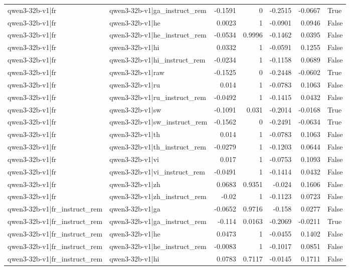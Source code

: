 \begin{table}
\begin{tabular}{l l r r r r l}
qwen3-32b-v1|fr & qwen3-32b-v1|ga_instruct_rem & -0.1591 & 0 & -0.2515 & -0.0667 & True \\
qwen3-32b-v1|fr & qwen3-32b-v1|he & 0.0023 & 1 & -0.0901 & 0.0946 & False \\
qwen3-32b-v1|fr & qwen3-32b-v1|he_instruct_rem & -0.0534 & 0.9996 & -0.1462 & 0.0395 & False \\
qwen3-32b-v1|fr & qwen3-32b-v1|hi & 0.0332 & 1 & -0.0591 & 0.1255 & False \\
qwen3-32b-v1|fr & qwen3-32b-v1|hi_instruct_rem & -0.0234 & 1 & -0.1158 & 0.0689 & False \\
qwen3-32b-v1|fr & qwen3-32b-v1|raw & -0.1525 & 0 & -0.2448 & -0.0602 & True \\
qwen3-32b-v1|fr & qwen3-32b-v1|ru & 0.014 & 1 & -0.0783 & 0.1063 & False \\
qwen3-32b-v1|fr & qwen3-32b-v1|ru_instruct_rem & -0.0492 & 1 & -0.1415 & 0.0432 & False \\
qwen3-32b-v1|fr & qwen3-32b-v1|sw & -0.1091 & 0.031 & -0.2014 & -0.0168 & True \\
qwen3-32b-v1|fr & qwen3-32b-v1|sw_instruct_rem & -0.1562 & 0 & -0.2491 & -0.0634 & True \\
qwen3-32b-v1|fr & qwen3-32b-v1|th & 0.014 & 1 & -0.0783 & 0.1063 & False \\
qwen3-32b-v1|fr & qwen3-32b-v1|th_instruct_rem & -0.0279 & 1 & -0.1203 & 0.0644 & False \\
qwen3-32b-v1|fr & qwen3-32b-v1|vi & 0.017 & 1 & -0.0753 & 0.1093 & False \\
qwen3-32b-v1|fr & qwen3-32b-v1|vi_instruct_rem & -0.0491 & 1 & -0.1414 & 0.0432 & False \\
qwen3-32b-v1|fr & qwen3-32b-v1|zh & 0.0683 & 0.9351 & -0.024 & 0.1606 & False \\
qwen3-32b-v1|fr & qwen3-32b-v1|zh_instruct_rem & -0.02 & 1 & -0.1123 & 0.0723 & False \\
qwen3-32b-v1|fr_instruct_rem & qwen3-32b-v1|ga & -0.0652 & 0.9716 & -0.158 & 0.0277 & False \\
qwen3-32b-v1|fr_instruct_rem & qwen3-32b-v1|ga_instruct_rem & -0.114 & 0.0163 & -0.2069 & -0.0211 & True \\
qwen3-32b-v1|fr_instruct_rem & qwen3-32b-v1|he & 0.0473 & 1 & -0.0455 & 0.1402 & False \\
qwen3-32b-v1|fr_instruct_rem & qwen3-32b-v1|he_instruct_rem & -0.0083 & 1 & -0.1017 & 0.0851 & False \\
qwen3-32b-v1|fr_instruct_rem & qwen3-32b-v1|hi & 0.0783 & 0.7117 & -0.0145 & 0.1711 & False \\

\end{tabular}
\end{table}
